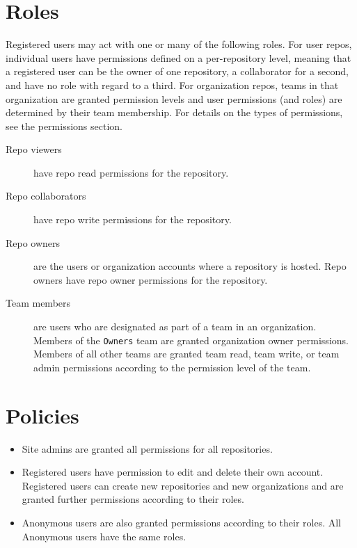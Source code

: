\documentclass[11pt]{article}
\begin{document}

\section*{Roles}
Registered users may act with one or many of the following roles. For user repos, individual users have permissions defined on a per-repository level, meaning that a registered user can be the owner of one repository, a collaborator for a second, and have no role with regard to a third. For organization repos, teams in that organization are granted permission levels and user permissions (and roles) are determined by their team membership. For details on the types of permissions, see the permissions section.

\begin{description}

\item[Repo viewers] have repo read permissions for the repository.
\item[Repo collaborators] have repo write permissions for the repository.
\item[Repo owners] are the users or organization accounts where a repository is hosted. Repo owners have repo owner permissions for the repository.
\item[Team members] are users who are designated as part of a team in an organization. Members of the \texttt{Owners} team are granted organization owner permissions. Members of all other teams are granted team read, team write, or team admin permissions according to the permission level of the team.

\end{description}

\section*{Policies}
\begin{itemize}
\item Site admins are granted all permissions for all repositories.
\item Registered users have permission to edit and delete their own account. Registered users can create new repositories and new organizations and are granted further permissions according to their roles.
\item Anonymous users are also granted permissions according to their roles. All Anonymous users have the same roles.
\end{itemize}
\end{document}
